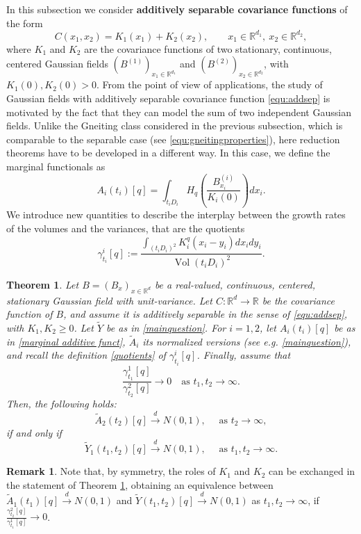 \documentclass[12pt]{article}
\DeclareMathOperator{\1}{1}
\DeclareMathOperator{\vol}{Vol}
\newcommand{\R}{\mathbb{R}}
\theoremstyle{plain}
\newtheorem{theorem}{Theorem}
\theoremstyle{definition}
\newtheorem{remark}{Remark}
\begin{document}
In this subsection we consider \textbf{additively separable covariance functions} of the form
\begin{equation} \label{equ:addsep}
    C(x_1,x_2) = K_1(x_1)+K_2(x_2), \quad \quad x_1\in\R^{d_1}, \ x_2\in\R^{d_2},
\end{equation}
where $K_1$ and $K_2$ are the covariance functions of two stationary, continuous, centered Gaussian fields $(B^{(1)})_{x_1\in\R^{d_1}}$ and $(B^{(2)})_{x_2\in\R^{d_2}}$, with $K_1(0),K_2(0)>0$. From the point of view of applications, the study of Gaussian fields with additively separable covariance function \eqref{equ:addsep} is motivated by the fact that they can model the sum of two independent Gaussian fields.  
Unlike the Gneiting class considered in the previous subsection, which is comparable to the separable case (see \eqref{equ:gneitingproperties}), here reduction theorems have to be developed in a different way. In this case, we define the marginal functionals as
\begin{equation}
\label{marginal additive funct}
A_i(t_i)[q]=\int_{t_iD_i}H_q\left(\frac{B^{(i)}_{x_i}}{K_i(0)}\right)dx_i. 
\end{equation} 
We introduce new quantities to describe the interplay between the growth rates of the volumes and the variances, that are the quotients
\begin{equation}
\label{quotients}
    \gamma^i_{t_i}[q] := \frac{\int_{(t_iD_i)^2}K_i^q(x_i-y_i)dx_idy_i}{\vol(t_iD_i)^2}.
    \end{equation}
\begin{theorem}\label{thm:main 4}
Let $B=(B_x)_{x\in\R^d}$ be a real-valued, continuous, centered, stationary Gaussian field with unit-variance. Let $C:\R^d \rightarrow \R$ be the covariance function of $B$, and assume it is additively separable in the sense of \eqref{equ:addsep}, with $K_1,K_2\ge0$. Let $\widetilde Y$ be as in \eqref{mainquestion}. For $i=1,2$, let $A_i(t_i)[q]$ be as in \eqref{marginal additive funct}, $\widetilde A_i$ its normalized versions (see e.g. \eqref{mainquestion}), and recall the definition \eqref{quotients} of $\gamma^i_{t_i}[q]$. Finally, assume that 
 \[
 \frac{\gamma^1_{t_1}[q]}{\gamma^2_{t_2}[q]}\rightarrow0 \quad \text{as $t_1,t_2\rightarrow\infty$}.
 \]
 Then, the following holds:
 \[
 \widetilde{A}_2(t_2)[q]\overset{d}{\rightarrow} N(0,1), \quad\text{ as }t_2\rightarrow\infty ,
 \]
 if and only if
 \[
 \widetilde{Y}_1(t_1,t_2)[q]\overset{d}{\rightarrow} N(0,1), \quad \text{ as }t_1,t_2\rightarrow\infty.
 \]
\end{theorem}
\begin{remark}
    Note that, by symmetry, the roles of $K_1$ and $K_2$ can be exchanged in the statement of Theorem \ref{thm:main 4}, obtaining an equivalence between $\widetilde{A}_1(t_1)[q]\overset{d}{\rightarrow} N(0,1)$ and $\widetilde{Y}(t_1,t_2)[q]\overset{d}{\rightarrow} N(0,1)$ as $t_1,t_2\rightarrow\infty$, if $\frac{\gamma^2_{t_2}[q]}{\gamma^1_{t_1}[q]}\rightarrow0$. 
\end{remark}
\end{document}
